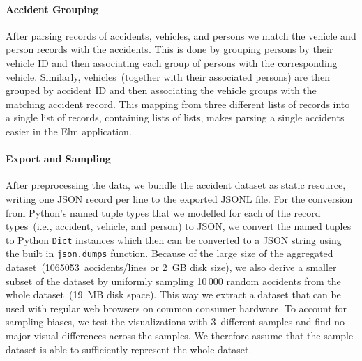 \paragraph{Accident Grouping}
After parsing records of accidents, vehicles, and persons we match the vehicle and person records with the accidents. This is done by grouping persons by their vehicle ID and then associating each group of persons with the corresponding vehicle. Similarly, vehicles~(together with their associated persons) are then grouped by accident ID and then associating the vehicle groups with the matching accident record. This mapping from three different lists of records into a single list of records, containing lists of lists, makes parsing a single accidents easier in the Elm application.

\paragraph{Export and Sampling}
\label{export}
After preprocessing the data, we bundle the accident dataset as static resource, writing one JSON record per line to the exported JSONL file. For the conversion from Python's named tuple types that we modelled for each of the record types~(i.e., accident, vehicle, and person) to JSON, we convert the named tuples to Python \lstinline[language=Python]{Dict} instances which then can be converted to a JSON string using the built in \lstinline[language=Python]{json.dumps} function. Because of the large size of the aggregated dataset~(1065053~accidents/lines or 2~GB disk size), we also derive a smaller subset of the dataset by uniformly sampling 10\,000 random accidents from the whole dataset~(19~MB disk space). This way we extract a dataset that can be used with regular web browsers on common consumer hardware. To account for sampling biases, we test the visualizations with 3~different samples and find no major visual differences across the samples. We therefore assume that the sample dataset is able to sufficiently represent the whole dataset.
